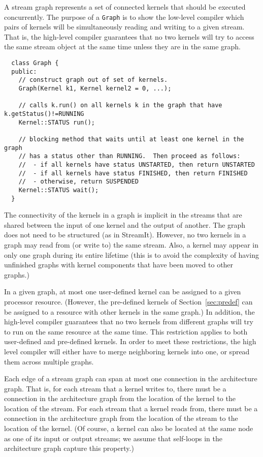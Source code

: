 A stream graph represents a set of connected kernels that should be
executed concurrently.  The purpose of a {\tt Graph} is to show the
low-level compiler which pairs of kernels will be simultaneously
reading and writing to a given stream.  That is, the high-level
compiler guarantees that no two kernels will try to access the same
stream object at the same time unless they are in the same graph.
{\small
\begin{verbatim}
  class Graph {
  public:
    // construct graph out of set of kernels.
    Graph(Kernel k1, Kernel kernel2 = 0, ...);

    // calls k.run() on all kernels k in the graph that have k.getStatus()!=RUNNING
    Kernel::STATUS run();

    // blocking method that waits until at least one kernel in the graph 
    // has a status other than RUNNING.  Then proceed as follows:
    //  - if all kernels have status UNSTARTED, then return UNSTARTED
    //  - if all kernels have status FINISHED, then return FINISHED
    //  - otherwise, return SUSPENDED
    Kernel::STATUS wait();
  }
\end{verbatim}}
\noindent The connectivity of the kernels in a graph is implicit in
the streams that are shared between the input of one kernel and the
output of another.  The graph does not need to be structured (as in
StreamIt).  However, no two kernels in a graph may read from (or write
to) the same stream.  Also, a kernel may appear in only one graph
during its entire lifetime (this is to avoid the complexity of having
unfinished graphs with kernel components that have been moved to other
graphs.)

In a given graph, at most one user-defined kernel can be assigned to a
given processor resource.  (However, the pre-defined kernels of
Section~\ref{sec:predef} can be assigned to a resource with other
kernels in the same graph.)  In addition, the high-level compiler
guarantees that no two kernels from different graphs will try to run
on the same resource at the same time.  This restriction applies to
both user-defined and pre-defined kernels.  In order to meet these
restrictions, the high level compiler will either have to merge
neighboring kernels into one, or spread them across multiple graphs.

Each edge of a stream graph can span at most one connection in the
architecture graph.  That is, for each stream that a kernel writes to,
there must be a connection in the architecture graph from the location
of the kernel to the location of the stream.  For each stream that a
kernel reads from, there must be a connection in the architecture
graph from the location of the stream to the location of the kernel.
(Of course, a kernel can also be located at the same node as one of
its input or output streams; we assume that self-loops in the
architecture graph capture this property.)

